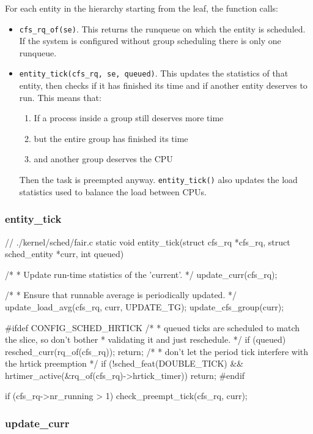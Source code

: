 For each entity in the hierarchy starting from the leaf, the function calls:
\begin{itemize}
    \item \verb|cfs_rq_of(se)|. This returns the runqueue on which the entity is scheduled. If the system is configured without group scheduling there is only one runqueue.
    
    \item \verb|entity_tick(cfs_rq, se, queued)|. This updates the statistics of that entity, then checks if it has finished its time and if another entity deserves to run. This means that:
    \begin{enumerate}
        \item If a process inside a group still deserves more time
        \item but the entire group has finished its time
        \item and another group deserves the CPU
    \end{enumerate}
    Then the task is preempted anyway. \verb|entity_tick()| also updates the load statistics used to balance the load between CPUs.
\end{itemize}

\subsubsection{entity\_tick}
\begin{code}
// ./kernel/sched/fair.c
static void
entity_tick(struct cfs_rq *cfs_rq, struct sched_entity *curr, int queued)
{
	/*
	 * Update run-time statistics of the 'current'.
	 */
	update_curr(cfs_rq);

	/*
	 * Ensure that runnable average is periodically updated.
	 */
	update_load_avg(cfs_rq, curr, UPDATE_TG);
	update_cfs_group(curr);

#ifdef CONFIG_SCHED_HRTICK
	/*
	 * queued ticks are scheduled to match the slice, so don't bother
	 * validating it and just reschedule.
	 */
	if (queued) {
		resched_curr(rq_of(cfs_rq));
		return;
	}
	/*
	 * don't let the period tick interfere with the hrtick preemption
	 */
	if (!sched_feat(DOUBLE_TICK) &&
			hrtimer_active(&rq_of(cfs_rq)->hrtick_timer))
		return;
#endif

	if (cfs_rq->nr_running > 1)
		check_preempt_tick(cfs_rq, curr);
}
\end{code}
\subsubsection{update\_curr}
\label{sec:update_curr}

